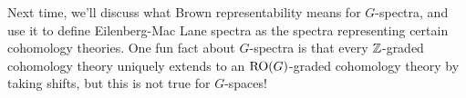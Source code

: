 Next time, we'll discuss what Brown representability means for $G$-spectra, and use it to define Eilenberg-Mac Lane
spectra as the spectra representing certain cohomology theories. One fun fact about $G$-spectra is that every
$\mathbb Z$-graded cohomology theory uniquely extends to an $\mathrm{RO}(G)$-graded cohomology theory by taking shifts, but this
is not true for $G$-spaces!

